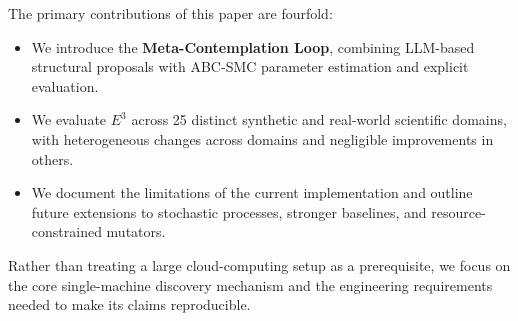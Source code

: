 The primary contributions of this paper are fourfold:
\begin{itemize}
    \item We introduce the \textbf{Meta-Contemplation Loop}, combining LLM-based structural proposals with ABC-SMC parameter estimation and explicit evaluation.
    \item We evaluate $E^3$ across 25 distinct synthetic and real-world scientific domains, with heterogeneous changes across domains and negligible improvements in others.
    \item We document the limitations of the current implementation and outline future extensions to stochastic processes, stronger baselines, and resource-constrained mutators.
\end{itemize}

Rather than treating a large cloud-computing setup as a prerequisite, we focus on the core single-machine discovery mechanism and the engineering requirements needed to make its claims reproducible.
